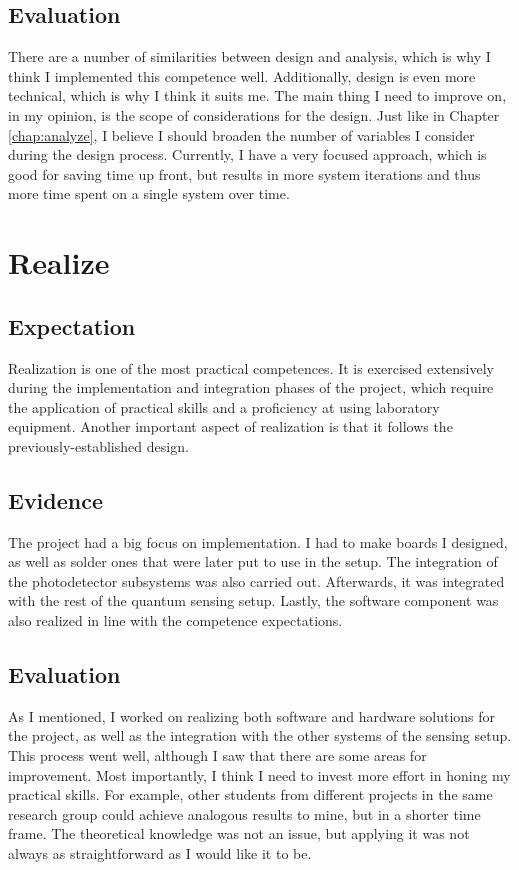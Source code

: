 \documentclass{report}
\begin{document}
\subsection{Evaluation}
There are a number of similarities between design and analysis, which is why I think I implemented this competence well. Additionally, design is even more technical, which is why I think it suits me. The main thing I need to improve on, in my opinion, is the scope of considerations for the design. Just like in Chapter \ref{chap:analyze}, I believe I should broaden the number of variables I consider during the design process. Currently, I have a very focused approach, which is good for saving time up front, but results in more system iterations and thus more time spent on a single system over time.

\section{Realize}%
\subsection{Expectation}
Realization is one of the most practical competences. It is exercised extensively during the implementation and integration phases of the project, which require the application of practical skills and a proficiency at using laboratory equipment. Another important aspect of realization is that it follows the previously-established design.

\subsection{Evidence}
The project had a big focus on implementation. I had to make boards I designed, as well as solder ones that were later put to use in the setup. The integration of the photodetector subsystems was also carried out. Afterwards, it was integrated with the rest of the quantum sensing setup. Lastly, the software component was also realized in line with the competence expectations. 

\subsection{Evaluation}
As I mentioned, I worked on realizing both software and hardware solutions for the project, as well as the integration with the other systems of the sensing setup. This process went well, although I saw that there are some areas for improvement. Most importantly, I think I need to invest more effort in honing my practical skills. For example, other students from different projects in the same research group could achieve analogous results to mine, but in a shorter time frame. The theoretical knowledge was not an issue, but applying it was not always as straightforward as I would like it to be. 
\end{document}
